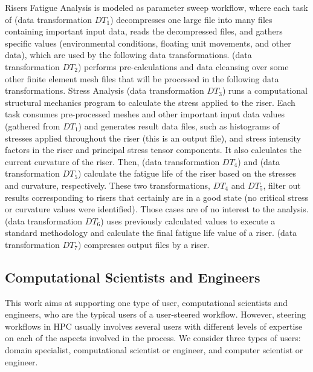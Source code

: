 Risers Fatigue Analysis is modeled as parameter sweep workflow, where each task of  (data transformation $DT_1$) decompresses one large file
into many files containing important input data, reads the decompressed
files, and gathers specific values (environmental conditions, floating
unit movements, and other data), which are used by the following
data transformations.  (data transformation $DT_2$) performs pre-calculations and
data cleansing over some other finite element mesh files that will be
processed in the following data transformations. Stress Analysis (data transformation $DT_3$) runs
a computational structural mechanics program to calculate the stress
applied to the riser. Each task consumes pre-processed meshes and other
important input data values (gathered from $DT_1$) and generates
result data files, such as histograms of stresses applied throughout the
riser (this is an output file), and stress intensity factors in the
riser and principal stress tensor components. It also calculates the
current curvature of the riser. Then, 
(data transformation $DT_4$) and  (data transformation $DT_5$)
calculate the fatigue life of the riser based on the stresses and
curvature, respectively. These two transformations, $DT_4$ and $DT_5$, filter out results
corresponding to risers that certainly are in a good state (no critical
stress or curvature values were identified). Those cases are of no
interest to the analysis.  (data transformation $DT_6$) uses
previously calculated values to execute a standard methodology
\cite{DetNorseVeritas2010Recommended}
and calculate the final fatigue life value of a riser.
(data transformation $DT_7$) compresses output files by a riser.



\subsection{Computational Scientists and Engineers}
\label{cse_users}

This work aims at supporting one type of user, \ie{}
computational scientists and engineers,
who are the typical users of a user-steered
workflow. However, steering workflows in HPC usually
involves several users with different levels of expertise on each
of the aspects involved in the process. We consider three types of
users: domain specialist, computational scientist or engineer, and computer
scientist or engineer.

